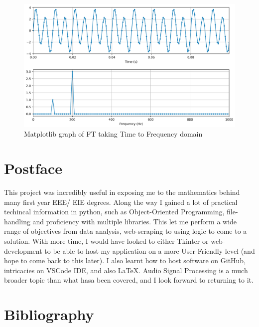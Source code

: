 \documentclass[a4paper,12pt]{article}
\begin{document}
\newpage

\begin{figure}[h!]
    \centering
    \includegraphics[width=16cm]{FourierTransform Demo.png}
    \caption{Matplotlib graph of FT taking Time to Frequency domain \parencite{GitHubRepo}}
\end{figure}

\section{Postface}
This project was incredibly useful in exposing me to the mathematics behind many first year EEE/ EIE degrees. Along the way I gained a lot of practical techincal information in python,
such as Object-Oriented Programming, file-handling and proficiency with multiple libraries. This let me perform a wide range of objectives from data analysis, web-scraping to using logic to come to a solution.
With more time, I would have looked to either Tkinter or web-development to be able to host my application on a more User-Friendly level (and hope to come back to this later). 
I also learnt how to host software on GitHub, intricacies on VSCode IDE, and also LaTeX. Audio Signal Processing is a much broader topic than what hasa been covered, and I look forward to returning to it.

\newpage
\section{Bibliography}
\doublespacing
\printbibliography[heading = none]
\end{document}
